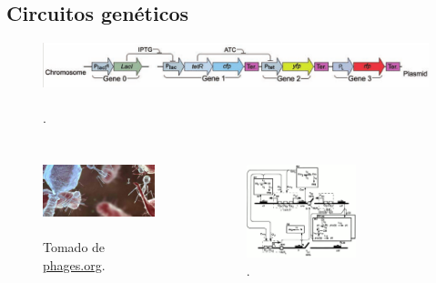 \documentclass[xcolor=dvipsnames]{beamer}
\begin{document}
\subsection{Circuitos gen\'eticos}
\begin{frame}
\begin{figure}[p]
    \centering
    \includegraphics[width=1\textwidth]{lan-circuit}~\\
    \tiny \cite{pedraza05}.
\end{figure}

\begin{columns}[c]


\begin{figure}[p]
    \centering
    \includegraphics[width=\textwidth]{phageim}~\\
    \tiny Tomado de \url{phages.org}.
\end{figure}


\begin{figure}[p]
    \centering
    \includegraphics[width=0.6\textwidth]{con-biocircuits_comp.png}~\\
    \tiny \cite{arkin98}.
\end{figure}
\end{columns}
\end{frame}
\end{document}
